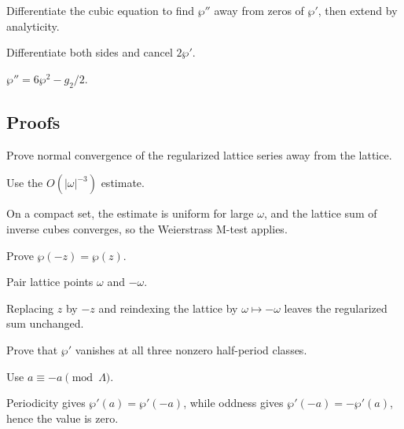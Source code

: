 \begin{exercise}\label{exr:iv29-expand-05}
Differentiate the cubic equation to find \(\wp''\) away from zeros of \(\wp'\), then extend by analyticity.
\end{exercise}
\begin{hint}
Differentiate both sides and cancel \(2\wp'\).
\end{hint}
\begin{solution}
\(\wp''=6\wp^2-g_2/2\).
\end{solution}

\subsection*{Proofs}

\begin{exercise}\label{exr:iv29-expand-06}
Prove normal convergence of the regularized lattice series away from the lattice.
\end{exercise}
\begin{hint}
Use the \(O(|\omega|^{-3})\) estimate.
\end{hint}
\begin{solution}
On a compact set, the estimate is uniform for large \(\omega\), and the lattice sum of inverse cubes converges, so the Weierstrass M-test applies.
\end{solution}

\begin{exercise}[Evenness]\label{exr:iv29-expand-07}
Prove \(\wp(-z)=\wp(z)\).
\end{exercise}
\begin{hint}
Pair lattice points \(\omega\) and \(-\omega\).
\end{hint}
\begin{solution}
Replacing \(z\) by \(-z\) and reindexing the lattice by \(\omega\mapsto-\omega\) leaves the regularized sum unchanged.
\end{solution}

\begin{exercise}\label{exr:iv29-expand-08}
Prove that \(\wp'\) vanishes at all three nonzero half-period classes.
\end{exercise}
\begin{hint}
Use \(a\equiv-a\pmod\Lambda\).
\end{hint}
\begin{solution}
Periodicity gives \(\wp'(a)=\wp'(-a)\), while oddness gives \(\wp'(-a)=-\wp'(a)\), hence the value is zero.
\end{solution}

